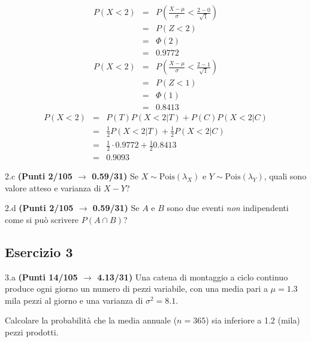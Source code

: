 \documentclass[
  11pt,
]{book}
\theoremstyle{mytheoremstyle}
\theoremstyle{mydefstyle}
\newenvironment{sol}
  {
  \begin{tcolorbox}[enhanced,breakable,arc=0.1mm,boxrule=1pt,colback=white,colframe=iblue,
  title=\bf \fontfamily{lmss}\selectfont \hspace{.5 cm} Soluzione,drop fuzzy shadow]

}{
\end{tcolorbox}
  }
\begin{document}
\begin{sol}
\begin{eqnarray*}
      P( X   <   2 ) 
        &=& P\left(  \frac { X  -  \mu }{ \sigma }  <  \frac { 2  -  0 }{\sqrt{ 1 }} \right)  \\
                 &=& P\left(  Z   <   2 \right) \\    
                 &=&  \Phi( 2 ) \\ &=&  0.9772 
      \end{eqnarray*}\begin{eqnarray*}
      P( X   <   2 ) 
        &=& P\left(  \frac { X  -  \mu }{ \sigma }  <  \frac { 2  -  1 }{\sqrt{ 1 }} \right)  \\
                 &=& P\left(  Z   <   1 \right) \\    
                 &=&  \Phi( 1 ) \\ &=&  0.8413 
      \end{eqnarray*}
\begin{eqnarray*}
P(X<2) &=& P(T)P(X<2|T)+P(C)P(X<2|C)\\
&=& \frac 12P(X<2|T)+\frac 12P(X<2|C)\\
&=& \frac 12\cdot 0.9772+\frac 12 0.8413\\
&=& 0.9093
\end{eqnarray*}

\end{sol}

2.c \textbf{(Punti 2/105 \(\rightarrow\) 0.59/31)} Se \(X\sim\text{Pois}(\lambda_X)\) e \(Y\sim\text{Pois}(\lambda_Y)\), quali sono valore atteso e varianza
di \(X-Y\)?

2.d \textbf{(Punti 2/105 \(\rightarrow\) 0.59/31)} Se \(A\) e \(B\) sono due eventi \emph{non} indipendenti come si può scrivere \(P(A\cap B)\)?

\subsection{Esercizio 3}\label{esercizio-3-28}

3.a \textbf{(Punti 14/105 \(\rightarrow\) 4.13/31)} Una catena di montaggio a ciclo continuo produce ogni giorno un numero di pezzi variabile, con una media pari a
\(\mu=1.3\) mila pezzi al giorno e una varianza di \(\sigma^2=8.1\).

Calcolare la probabilità che la media annuale (\(n=365\)) sia inferiore a 1.2 (mila) pezzi prodotti.
\end{document}

